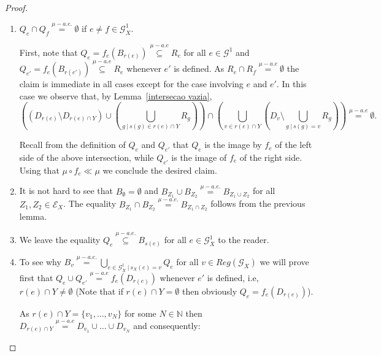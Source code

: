 \documentclass[12pt, reqno]{amsart}
\theoremstyle{definition}
\theoremstyle{remark}
\numberwithin{equation}{section}
\newcommand{\G}{\mathcal{G}}
\begin{document}
\begin{proof}
\begin{enumerate} 
 We will check the conditions of Definition \ref{relativebs}.
  
\item\label{Q_e cap R_Q =emptyset if e neq f} $Q_e\cap Q_f \stackrel{\mu-a.e.}{=} \emptyset$ if $e \neq f \in \mathcal{G}^1_X$.

First, note that $Q_e = f_e(B_{r(e)}) \stackrel{\mu-a.e}{\subseteq} R_e$ for all $e \in \G^1$ and $Q_{e'} = f_e(B_{r(e')})  \stackrel{\mu-a.e}{\subseteq} R_e$  whenever $e'$ is defined. As $R_e \cap R_f \stackrel{\mu-a.e}{=} \emptyset$ the claim is immediate in all cases except for the case involving $e$ and $e'$. In this case we observe that, by Lemma~\ref{intersecao vazia},
$$\left( (D_{r(e)} \setminus D_{r(e) \cap Y}) \cup \left( \bigcup\limits_{g \ | \ s(g) \in r(e) \cap Y} R_g \right) \right) \cap \left( \bigcup\limits_{v \in r(e) \cap Y} (D_v \setminus \bigcup\limits_{g \ | \ s(g) = v} R_g ) \right) \stackrel{\mu-a.e}{=} \emptyset.$$ 

Recall from the definition of $Q_e$ and $Q_{e'}$ that $Q_e$ is the image by $f_e$ of the left side of the above intersection, while $Q_{e'}$ is the image of $f_e$ of the right side. Using that $\mu \circ f_e \ll \mu$ we conclude the desired claim.



\item   It is not hard to see that $B_\emptyset=\emptyset$ and $B_{Z_1} \cup B_{Z_2} \stackrel{\mu-a.e.}{=} B_{Z_1 \cup Z_2}$  for all $Z_1, Z_2 \in \mathcal{E}_X$. The equality $ B_{Z_1} \cap B_{Z_2}\stackrel{\mu-a.e.}{=} B_{Z_1 \cap Z_2}$ follows from the previous lemma.



\item We leave the equality $Q_e\stackrel{\mu-a.e.}{\subseteq}B_{s(e)}$ for all $e\in \mathcal{G}^1_X$ to the reader. 


\item  To see why $B_v\stackrel{\mu-a.e.}{=} \bigcup\limits_{e \in \G_X^1 \ | \ s_X(e) = v}Q_e$ for all $v \in Reg(\G_X)$ we will prove first that $Q_e \cup Q_{e'} \stackrel{\mu-a.e}{=} f_e({D_{r(e)}})$ whenever $e'$ is defined, i.e, $r(e) \cap Y \neq \emptyset$ (Note that if $r(e) \cap Y = \emptyset$ then obviously $Q_e = f_e(D_{r(e)})$).

As $r(e) \cap Y = \{v_1, \ldots, v_N\}$ for some $N \in \mathbb{N}$ then $D_{r(e) \cap Y} \stackrel{\mu-a.e}{=} D_{v_1} \cup \ldots \cup D_{v_N}$ and consequently:


\end{enumerate}
\end{proof}
\end{document}
